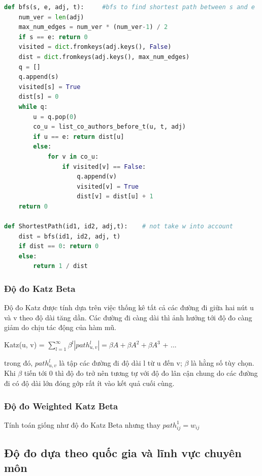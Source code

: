 \documentclass{article}
\begin{document}
\begin{lstlisting}[language=Python, caption=Độ đo Shortest Path]
def bfs(s, e, adj, t):     #bfs to find shortest path between s and e
    num_ver = len(adj)
    max_num_edges = num_ver * (num_ver-1) / 2
    if s == e: return 0
    visited = dict.fromkeys(adj.keys(), False)
    dist = dict.fromkeys(adj.keys(), max_num_edges)
    q = []
    q.append(s)
    visited[s] = True
    dist[s] = 0
    while q:
        u = q.pop(0)
        co_u = list_co_authors_before_t(u, t, adj)
        if u == e: return dist[u]
        else:
            for v in co_u:
                if visited[v] == False:
                    q.append(v)
                    visited[v] = True  
                    dist[v] = dist[u] + 1
    return 0

def ShortestPath(id1, id2, adj,t):    # not take w into account
    dist = bfs(id1, id2, adj, t)
    if dist == 0: return 0
    else:   
        return 1 / dist

\end{lstlisting}

\subsubsection{Độ đo Katz Beta}

Độ đo Katz được tính dựa trên việc thống kê tất cả các đường đi giữa hai nút u và v theo độ dài tăng dần. Các đường đi càng dài thì ảnh hưởng tới độ đo càng giảm do chịu tác động của hàm mũ.

\begin{center}
Katz(u, v) = $\sum_{l=1}^{\infty} \beta^l |path_{u, v}^l| = \beta A + \beta A^2 + \beta A^3 $ + ...
\end{center}

trong đó, $path_{u, v}^l$ là tập các đường đi độ dài l từ u đến v; $\beta$ là hằng số tùy chọn. Khi $\beta$ tiến tới 0 thì độ đo trở nên tương tự với độ đo lân cận chung do các đường đi có độ dài lớn đóng gớp rất ít vào kết quả cuối cùng.

\subsubsection{Độ đo Weighted Katz Beta}

Tính toán giống như độ đo Katz Beta nhưng thay $path_{ij}^1 = w_{ij}$

\subsection{Độ đo dựa theo quốc gia và lĩnh vực chuyên môn}
\end{document}
